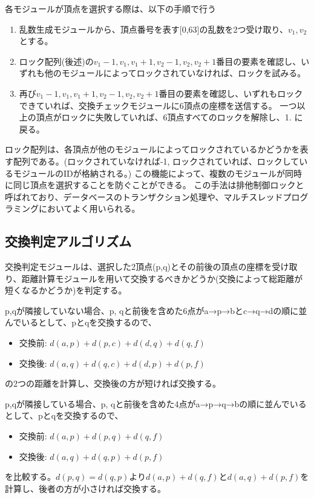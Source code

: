 各モジュールが頂点を選択する際は、以下の手順で行う
\begin{enumerate}
    \item 乱数生成モジュールから、頂点番号を表す[0,63]の乱数を2つ受け取り、$v_1, v_2$とする。
    \item ロック配列(後述)の$v_1-1, v_1, v_1+1, v_2-1, v_2, v_2+1$番目の要素を確認し、いずれも他のモジュールによってロックされていなければ、ロックを試みる。
    \item 再び$v_1-1, v_1, v_1+1, v_2-1, v_2, v_2+1$番目の要素を確認し、いずれもロックできていれば、交換チェックモジュールに6頂点の座標を送信する。
          一つ以上の頂点がロックに失敗していれば、6頂点すべてのロックを解除し、1. に戻る。
\end{enumerate}
ロック配列は、各頂点が他のモジュールによってロックされているかどうかを表す配列である。(ロックされていなければ-1, ロックされていれば、ロックしているモジュールのIDが格納される。)
この機能によって、複数のモジュールが同時に同じ頂点を選択することを防ぐことができる。
この手法は排他制御ロックと呼ばれており、データベースのトランザクション処理や、マルチスレッドプログラミングにおいてよく用いられる。

\subsection*{交換判定アルゴリズム}
交換判定モジュールは、選択した2頂点(p,q)とその前後の頂点の座標を受け取り、距離計算モジュールを用いて交換するべきかどうか(交換によって総距離が短くなるかどうか)を判定する。

p,qが隣接していない場合、p, qと前後を含めた6点がa→p→bとc→q→dの順に並んでいるとして、pとqを交換するので、
\begin{itemize}
    \item 交換前: $d(a,p)+d(p,c)+d(d,q)+d(q,f)$
    \item 交換後: $d(a,q)+d(q,c)+d(d,p)+d(p,f)$
\end{itemize}
の2つの距離を計算し、交換後の方が短ければ交換する。

p,qが隣接している場合、p, qと前後を含めた4点がa→p→q→bの順に並んでいるとして、pとqを交換するので、
\begin{itemize}
    \item 交換前: $d(a,p)+d(p,q)+d(q,f)$
    \item 交換後: $d(a,q)+d(q,p)+d(p,f)$
\end{itemize}
を比較する。$d(p,q)=d(q,p)$より$d(a,p)+d(q,f)$と$d(a,q)+d(p,f)$を計算し、後者の方が小さければ交換する。

